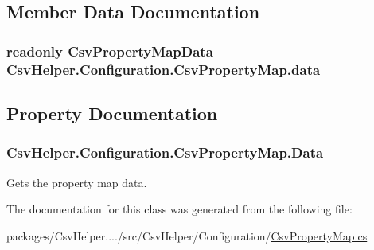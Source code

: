 \subsection{Member Data Documentation}
\hypertarget{a00050_a2943371f5d55b2fd7313bbb0e87a013c}{
\subsubsection[{data}]{\setlength{\rightskip}{0pt plus 5cm}readonly {\bf Csv\-Property\-Map\-Data} Csv\-Helper.\-Configuration.\-Csv\-Property\-Map.\-data\hspace{0.3cm}{\ttfamily [private]}}}\label{a00050_a2943371f5d55b2fd7313bbb0e87a013c}


\subsection{Property Documentation}
\hypertarget{a00050_a207637fa121612b618ed1131cb28b8bb}{
\subsubsection[{Data}]{ Csv\-Helper.\-Configuration.\-Csv\-Property\-Map.\-Data\hspace{0.3cm}{\ttfamily [get]}}}\label{a00050_a207637fa121612b618ed1131cb28b8bb}


Gets the property map data. 



The documentation for this class was generated from the following file\-:\begin{DoxyCompactItemize}
\item 
packages/\-Csv\-Helper..../src/\-Csv\-Helper/\-Configuration/\hyperlink{a00187}{Csv\-Property\-Map.\-cs}\end{DoxyCompactItemize}
